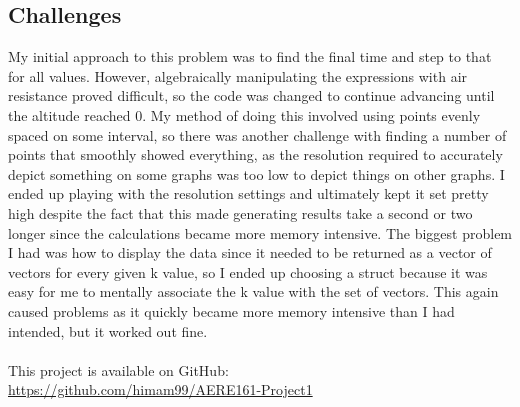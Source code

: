 \documentclass[oneside]{article}
\begin{document}
\subsection{Challenges}
My initial approach to this problem was to find the final time and step to that for all values. However, algebraically manipulating the expressions with air resistance proved difficult, so the code was changed to continue advancing until the altitude reached 0. My method of doing this involved using points evenly spaced on some interval, so there was another challenge with finding a number of points that smoothly showed everything, as the resolution required to accurately depict something on some graphs was too low to depict things on other graphs. I ended up playing with the resolution settings and ultimately kept it set pretty high despite the fact that this made generating results take a second or two longer since the calculations became more memory intensive. The biggest problem I had was how to display the data since it needed to be returned as a vector of vectors for every given k value, so I ended up choosing a struct because it was easy for me to mentally associate the k value with the set of vectors. This again caused problems as it quickly became more memory intensive than I had intended, but it worked out fine.\\ \\
This project is available on GitHub:\\ \url{https://github.com/himam99/AERE161-Project1}
\end{document}
